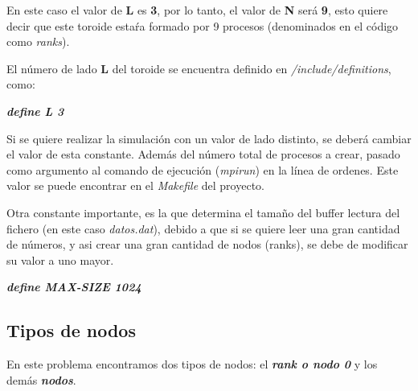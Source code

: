 \documentclass[11pt]{article}
\begin{document}
En este caso el valor de \textbf{L} es \textbf{3}, por lo tanto, el valor de \textbf{N} será \textbf{9}, esto quiere decir que este toroide estaŕa formado por 9 procesos (denominados en el código como \textit{ranks}).

El número de lado \textbf{L} del toroide se encuentra definido en \textit{/include/definitions}, como:

\textit{\textbf{define L 3}}

Si se quiere realizar la simulación con un valor de lado distinto, se deberá cambiar el valor de esta constante. Además del número total de procesos a crear, pasado como argumento al comando de ejecución (\textit{mpirun}) en la línea de ordenes. Este valor se puede encontrar en el \textit{Makefile} del proyecto.

Otra constante importante, es la que determina el tamaño del buffer lectura del fichero (en este caso \textit{datos.dat}), debido a que si se quiere leer una gran cantidad de números, y asi crear una gran cantidad de nodos (ranks), se debe de modificar su valor a uno mayor.

\textit{\textbf{define MAX-SIZE 1024}}

\subsection{Tipos de nodos}
En este problema encontramos dos tipos de nodos: el \textbf{\textit{rank o nodo 0}} y los demás \textbf{\textit{nodos}}.
\end{document}

